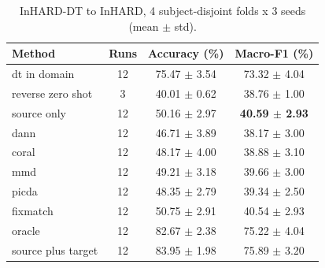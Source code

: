 \begin{table}[t]
\centering
\caption{InHARD-DT to InHARD, 4 subject-disjoint folds x 3 seeds (mean $\pm$ std).}
\label{tab:main}
\begin{tabular}{lccc}
\toprule
Method & Runs & Accuracy (\%) & Macro-F1 (\%) \\
\midrule
dt in domain & 12 & 75.47 $\pm$ 3.54 & 73.32 $\pm$ 4.04 \\
reverse zero shot & 3 & 40.01 $\pm$ 0.62 & 38.76 $\pm$ 1.00 \\
source only & 12 & 50.16 $\pm$ 2.97 & \textbf{40.59 $\pm$ 2.93} \\
dann & 12 & 46.71 $\pm$ 3.89 & 38.17 $\pm$ 3.00 \\
coral & 12 & 48.17 $\pm$ 4.00 & 38.88 $\pm$ 3.10 \\
mmd & 12 & 49.21 $\pm$ 3.18 & 39.66 $\pm$ 3.00 \\
picda & 12 & 48.35 $\pm$ 2.79 & 39.34 $\pm$ 2.50 \\
fixmatch & 12 & 50.75 $\pm$ 2.91 & 40.54 $\pm$ 2.93 \\
oracle & 12 & 82.67 $\pm$ 2.38 & 75.22 $\pm$ 4.04 \\
source plus target & 12 & 83.95 $\pm$ 1.98 & 75.89 $\pm$ 3.20 \\
\bottomrule
\end{tabular}
\end{table}